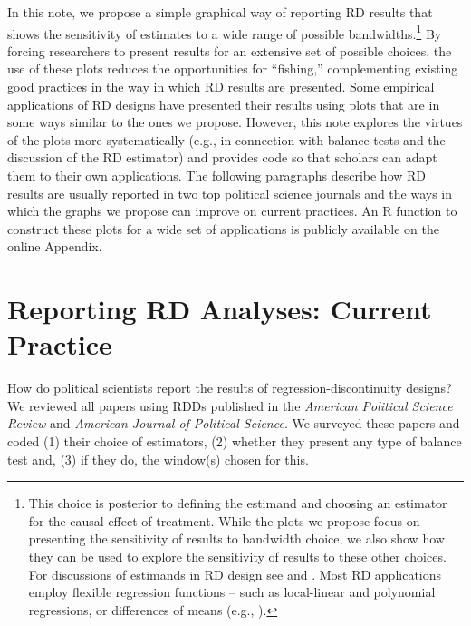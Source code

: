 \documentclass[letterpaper,twoside,12pt]{article}\usepackage[]{graphicx}\usepackage[]{color}
\begin{document}
In this note, we propose a simple graphical way of reporting RD results that shows the sensitivity of estimates to a wide range of possible bandwidths.\footnote{
This choice is posterior to defining the estimand and choosing an estimator for the causal effect of treatment. While the plots we propose focus on presenting the sensitivity of results to bandwidth choice, we also show how they can be used to explore the sensitivity of results to these other choices. For discussions of estimands in RD design see \citet{dunning2012natural} and \citet{calonico2015robust}. Most RD applications employ flexible regression functions -- such as local-linear and polynomial regressions, or differences  of means (e.g., \citet{imbens2008regression, lee2008randomized, dunning2012natural}).} By forcing researchers to present results for an extensive set of possible choices, the use of these plots reduces the opportunities for ``fishing,'' complementing existing good practices in the way in which RD results are presented. Some empirical applications of RD designs have presented their results using plots that are in some ways similar to the ones we propose. However, this note explores the virtues of the plots more systematically (e.g., in connection with balance tests and the discussion of the RD estimator) and provides code so that scholars can adapt them to their own applications. The following paragraphs describe how RD results are usually reported in two top political science journals and the ways in which the graphs we propose can improve on current practices. An R function to construct these plots for a wide set of applications is publicly available on the online Appendix.

\section*{Reporting RD Analyses: Current Practice}
    
How do political scientists report the results of regression-discontinuity designs? We reviewed all papers using RDDs published in the \emph{American Political Science Review} and \emph{American Journal of Political Science}.  We surveyed these papers and coded (1) their choice of estimators, (2) whether they present any type of balance test and, (3) if they do, the window(s) chosen for this.
\end{document}
